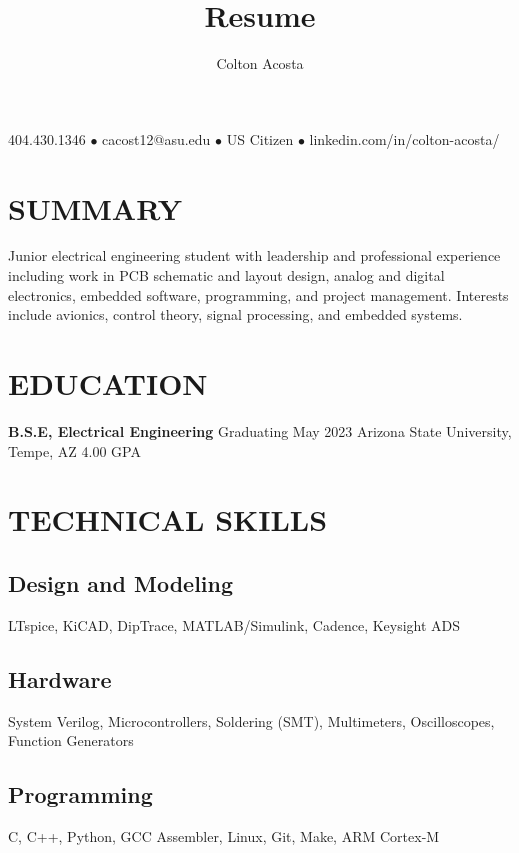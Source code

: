 \documentclass{article}
\makeatletter
\renewcommand{\maketitle}{
	\begin{center}
		{\huge\bfseries
			\theauthor}
			
		404.430.1346 $\bullet$ cacost12@asu.edu $\bullet$ US Citizen $\bullet$ linkedin.com/in/colton-acosta/
	\end{center}
}
\makeatother
\begin{document}
\title{Resume}
\author{Colton Acosta}
\maketitle
\section{SUMMARY}
Junior electrical engineering student with leadership and professional experience including work in PCB schematic and layout design, analog and digital electronics, embedded software, programming, and project management. Interests include avionics, control theory, signal processing, and embedded systems. 
\section{EDUCATION}
\textbf{B.S.E, Electrical Engineering}
\hfill 
Graduating May 2023
\linebreak
Arizona State University, Tempe, AZ 
\hfill
4.00 GPA

\section{TECHNICAL SKILLS}
\subsection{Design and Modeling}
LTspice, KiCAD, DipTrace, MATLAB/Simulink, Cadence, Keysight ADS 
\subsection{Hardware}
System Verilog, Microcontrollers, Soldering (SMT), Multimeters, Oscilloscopes, Function Generators 
\subsection{Programming} 
C, C++, Python, GCC Assembler, Linux, Git, Make, ARM Cortex-M 
\end{document}
